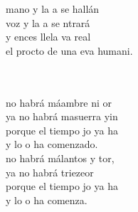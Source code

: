 \documentclass[12pt]{article}
\begin{document}
\begin{multicols*}{2}
\begin{cancion}%
	\begin{chorus}%
	 mano y la a se hallán\\
	 voz y la a se ntrará\\
	y ences llela va real\\
	el procto de una eva humani.\\
	\end{chorus}%
	\jump\\
	  \\
	no habrá máambre ni or\\
	ya no habrá masuerra yin\\
	porque el tiempo jo ya ha \\
	y lo o ha comenzado.\\
\jump
	no habrá málantos y tor, \\
	ya no habrá triezeor\\
	porque el tiempo jo ya ha \\
	y lo o ha comenza.\\
\end{cancion}%


\end{multicols*}
\end{document}
